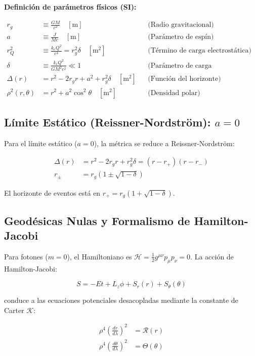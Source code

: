 \documentclass[12pt,a4paper]{article}
\begin{document}
\textbf{Definición de parámetros físicos (SI):}

\begin{align}
r_g &\equiv \frac{GM}{c^2} \quad [\text{m}] && \text{(Radio gravitacional)} \\
a &\equiv \frac{J}{Mc} \quad [\text{m}] && \text{(Parámetro de espín)} \\
r_Q^2 &\equiv \frac{k_e Q^2}{c^4} = r_g^2 \delta \quad [\text{m}^2] && \text{(Término de carga electrostática)} \\
\delta &\equiv \frac{k_e Q^2}{G M^2 c^2} \ll 1 && \text{(Parámetro de carga adimensional)} \\
\Delta(r) &= r^2 - 2r_g r + a^2 + r_g^2 \delta \quad [\text{m}^2] && \text{(Función del horizonte)} \\
\rho^2(r,\theta) &= r^2 + a^2 \cos^2\theta \quad [\text{m}^2] && \text{(Densidad polar)}
\end{align}

\subsection{Límite Estático (Reissner-Nordström): $a = 0$}

Para el límite estático ($a=0$), la métrica se reduce a Reissner-Nordström:

\begin{align}
\Delta(r) &= r^2 - 2r_g r + r_g^2 \delta = (r - r_+)(r - r_-) \\
r_{\pm} &= r_g \left(1 \pm \sqrt{1-\delta}\right)
\end{align}

El horizonte de eventos está en $r_+ = r_g(1 + \sqrt{1-\delta})$.

\subsection{Geodésicas Nulas y Formalismo de Hamilton-Jacobi}

Para fotones ($m=0$), el Hamiltoniano es $\mathcal{H} = \frac{1}{2} g^{\mu\nu} p_\mu p_\nu = 0$. La acción de Hamilton-Jacobi:

\begin{equation}
S = -Et + L_z \phi + S_r(r) + S_\theta(\theta)
\end{equation}

conduce a las ecuaciones potenciales desacopladas mediante la constante de Carter $\mathcal{K}$:

\begin{align}
\rho^4 \left(\frac{dr}{d\lambda}\right)^2 &= \mathcal{R}(r) \\
\rho^4 \left(\frac{d\theta}{d\lambda}\right)^2 &= \Theta(\theta)
\end{align}
\end{document}
